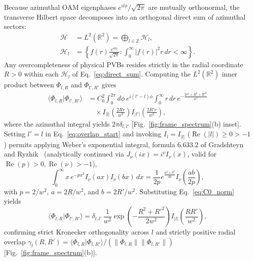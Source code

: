 \documentclass[aps,pra,reprint,amsmath,amssymb,floatfix,longbibliography]{revtex4-2}
\providecommand{\braket}[2]{\langle#1\vert#2\rangle}
\providecommand{\abs}[1]{\lvert#1\rvert}
\providecommand{\norm}[1]{\lVert#1\rVert}
\begin{document}
Because azimuthal OAM eigenphases $e^{il\phi}/\sqrt{2\pi}$ are mutually orthonormal, the transverse Hilbert space decomposes into an orthogonal direct sum of azimuthal sectors:
\begin{align}
\mathcal{H} &= L^2(\mathbb{R}^2) = \bigoplus_{l\in\mathbb{Z}} \mathcal{H}_l, \nonumber \\
\mathcal{H}_l &= \left\{ f(r)\frac{e^{il\phi}}{\sqrt{2\pi}} : \int_0^\infty \abs{f(r)}^2 r\,dr < \infty \right\}.
\label{eq:direct_sum}
\end{align}
Any overcompleteness of physical PVBs resides strictly in the radial coordinate $R > 0$ within each $\mathcal{H}_l$ of Eq.~\eqref{eq:direct_sum}. Computing the $L^2(\mathbb{R}^2)$ inner product between $\Phi_{l,R}$ and $\Phi_{l',R'}$ gives
\begin{align}
\braket{\Phi_{l,R}}{\Phi_{l',R'}} &= C_0^2 \int_0^{2\pi} d\phi\, e^{i(l'-l)\phi} \int_0^\infty r\,dr\, e^{-\frac{2r^2+R^2+R'^2}{w^2}} \nonumber \\
&\quad \times I_{\lvert l\rvert}\!\left(\frac{2Rr}{w^2}\right) I_{\lvert l'\rvert}\!\left(\frac{2R'r}{w^2}\right),
\label{eq:overlap_start}
\end{align}
where the azimuthal integral yields $2\pi\delta_{l,l'}$ [Fig.~\ref{fig:frame_spectrum}(b) inset]. Setting $l'=l$ in Eq.~\eqref{eq:overlap_start} and invoking $I_l = I_{\abs{l}}$ ($\operatorname{Re}(\abs{l}) \ge 0 > -1$) permits applying Weber's exponential integral, formula 6.633.2 of Gradshteyn and Ryzhik~\cite{Gradshteyn2014} (analytically continued via $J_\nu(ix)=i^\nu I_\nu(x)$, valid for $\operatorname{Re}(p)>0, \operatorname{Re}(\nu)>-1$),
\begin{equation}
\int_0^\infty x\, e^{-px^2} I_\nu(ax) I_\nu(bx)\,dx = \frac{1}{2p} e^{\frac{a^2+b^2}{4p}} I_\nu\!\left(\frac{ab}{2p}\right),
\label{eq:weber_identity}
\end{equation}
with $p = 2/w^2$, $a = 2R/w^2$, and $b = 2R'/w^2$. Substituting Eq.~\eqref{eq:C0_norm} yields
\begin{equation}
\braket{\Phi_{l,R}}{\Phi_{l',R'}} = \delta_{l,l'}\,\frac{1}{w^2}\exp\!\left(-\frac{R^2 + R'^2}{2w^2}\right) I_{\abs{l}}\!\left(\frac{RR'}{w^2}\right),
\label{eq:overlap_closed}
\end{equation}
confirming strict Kronecker orthogonality across $l$ and strictly positive radial overlap $\gamma_l(R,R') = \braket{\Phi_{l,R}}{\Phi_{l,R'}}/\allowbreak(\norm{\Phi_{l,R}}\norm{\Phi_{l,R'}})$ [Fig.~\ref{fig:frame_spectrum}(b)].
\end{document}
